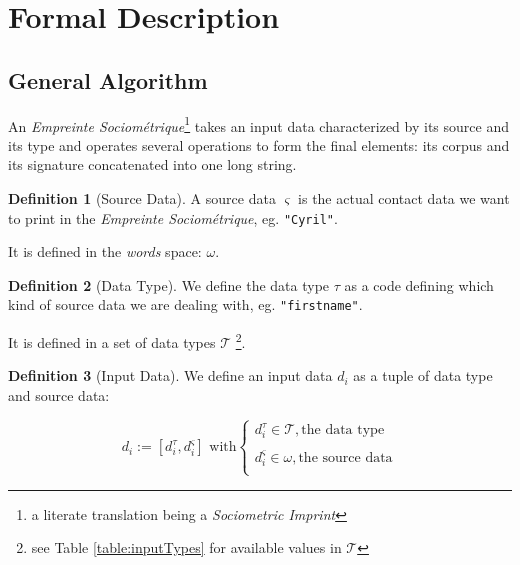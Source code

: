 \documentclass[twoside,twocolumn]{article}
\theoremstyle{definition}
\newtheorem{definition}{Definition}
\theoremstyle{remark}
\begin{document}
\section{Formal Description}

\subsection{General Algorithm}

An \emph{Empreinte Sociométrique}\footnote{a literate translation being a \emph{Sociometric Imprint}} takes an input data characterized by its source and 
its type and operates several operations to form the final elements: its corpus and its signature concatenated into one long string.

\begin{definition}[Source Data]
    \label{sourceData}
    A source data $\varsigma$ is the actual contact data we want to print in the \emph{Empreinte Sociométrique}, eg. \texttt{"Cyril"}.
    
    It is defined in the \emph{words} space: $\omega$.
\end{definition}

\begin{definition}[Data Type]
    \label{dataType}
    We define the data type $\tau$ as a code defining which kind of source data we are dealing with, eg. \texttt{"firstname"}.
    
    It is defined in a set of data types $\mathcal{T}$ \footnote{see Table \ref{table:inputTypes} for available values in $\mathcal{T}$}.
\end{definition}

\begin{definition}[Input Data]
    \label{inputData}
    We define an input data $d_i$ as a tuple of data type and source data:
    \begin{small}
        \begin{equation}
            \label{eq:inputData}
                d_i := [d_i^\tau, d_i^\varsigma] \textrm{ with}\left\{
                    \begin{array}{l}
                        d_i^\tau \in \mathcal{T}, \textrm{the data type} \\ \\
                        d_i^\varsigma \in \omega, \textrm{the source data} \\
                    \end{array}
                \right.
        \end{equation}
    \end{small}
\end{definition}
\end{document}
